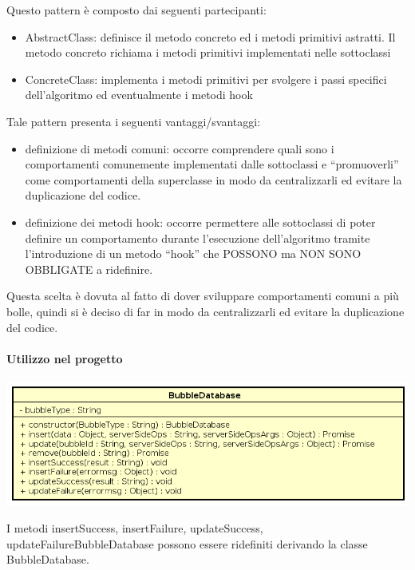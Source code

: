 Questo pattern è composto dai seguenti partecipanti:
\begin{itemize}
	\item AbstractClass: definisce il metodo concreto ed i metodi primitivi astratti. Il metodo concreto richiama i metodi primitivi implementati nelle sottoclassi
	\item ConcreteClass: implementa i metodi primitivi per svolgere i passi specifici dell’algoritmo ed eventualmente i metodi hook
\end{itemize}

Tale pattern presenta i seguenti vantaggi/svantaggi:
\begin{itemize}
	\item definizione di metodi comuni: occorre comprendere quali sono
     i comportamenti comunemente implementati dalle sottoclassi e
     “promuoverli” come comportamenti della superclasse in modo da
     centralizzarli ed evitare la duplicazione del codice. 
	\item definizione dei metodi hook: occorre permettere alle
     sottoclassi di poter definire un comportamento durante
     l’esecuzione dell’algoritmo tramite l’introduzione di un metodo
     “hook” che POSSONO ma NON SONO OBBLIGATE a ridefinire. 
\end{itemize}

Questa scelta è dovuta al fatto di dover sviluppare comportamenti comuni a più bolle, quindi si è deciso di far in modo da centralizzarli ed evitare la duplicazione del codice.

\paragraph{Utilizzo nel progetto}

\begin{center}
	\includegraphics[scale=0.30]{img/esempio2.png}
\end{center}

I metodi insertSuccess, insertFailure, updateSuccess, updateFailureBubbleDatabase possono essere ridefiniti derivando la classe BubbleDatabase.

